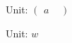 \documentclass{ctexart}
\begin{document}
Unit: $ \begin{pmatrix}a&\end{pmatrix}$

Unit: $ w$
\end{document}
